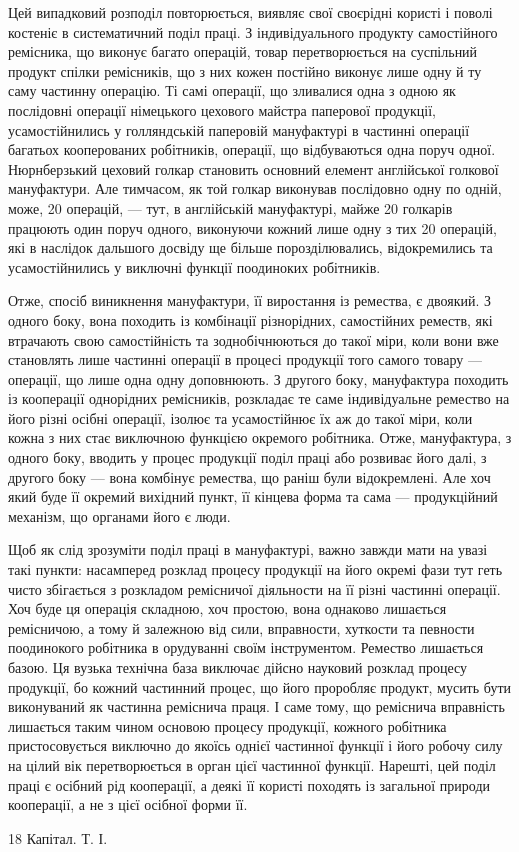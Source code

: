 Цей випадковий розподіл повторюється, виявляє свої своєрідні
користі і поволі костеніє в систематичний поділ праці. З індивідуального
продукту самостійного ремісника, що виконує багато
операцій, товар перетворюється на суспільний продукт спілки
ремісників, що з них кожен постійно виконує лише одну й ту
саму частинну операцію. Ті самі операції, що зливалися одна
з одною як послідовні операції німецького цехового майстра
паперової продукції, усамостійнились у голляндській паперовій
мануфактурі в частинні операції багатьох кооперованих робітників,
операції, що відбуваються одна поруч одної. Нюрнберзький
цеховий голкар становить основний елемент англійської голкової
мануфактури. Але тимчасом, як той голкар виконував послідовно
одну по одній, може, 20 операцій, — тут, в англійській мануфактурі,
майже 20 голкарів працюють один поруч одного, виконуючи
кожний лише одну з тих 20 операцій, які в наслідок дальшого
досвіду ще більше порозділювались, відокремились та усамостійнились
у виключні функції поодиноких робітників.

Отже, спосіб виникнення мануфактури, її виростання із ремества,
є двоякий. З одного боку, вона походить із комбінації
різнорідних, самостійних реместв, які втрачають свою самостійність
та зоднобічнюються до такої міри, коли вони вже становлять
лише частинні операції в процесі продукції того самого товару —
операції, що лише одна одну доповнюють. З другого боку, мануфактура
походить із кооперації однорідних ремісників, розкладає
те саме індивідуальне ремество на його різні осібні операції,
ізолює та усамостійнює їх аж до такої міри, коли кожна з них
стає виключною функцією окремого робітника. Отже, мануфактура,
з одного боку, вводить у процес продукції поділ праці
або розвиває його далі, з другого боку — вона комбінує ремества,
що раніш були відокремлені. Але хоч який буде її окремий вихідний
пункт, її кінцева форма та сама — продукційний механізм,
що органами його є люди.

Щоб як слід зрозуміти поділ праці в мануфактурі, важно
завжди мати на увазі такі пункти: насамперед розклад процесу
продукції на його окремі фази тут геть чисто збігається з розкладом
ремісничої діяльности на її різні частинні операції. Хоч буде
ця операція складною, хоч простою, вона однаково лишається
ремісничою, а тому й залежною від сили, вправности, хуткости
та певности поодинокого робітника в орудуванні своїм інструментом.
Ремество лишається базою. Ця вузька технічна база
виключає дійсно науковий розклад процесу продукції, бо кожний
частинний процес, що його проробляє продукт, мусить бути
виконуваний як частинна реміснича праця. І саме тому, що реміснича
вправність лишається таким чином основою процесу продукції,
кожного робітника пристосовується виключно до якоїсь
однієї частинної функції і його робочу силу на цілий вік перетворюється
в орган цієї частинної функції. Нарешті, цей поділ праці
є осібний рід кооперації, а деякі її користі походять із загальної
природи кооперації, а не з цієї осібної форми її.

18 Капітал. Т. І.
